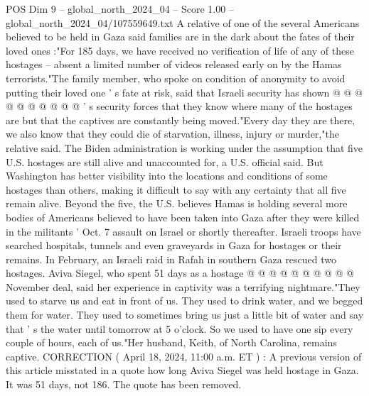 \begin{textsample}{POS Dim 9 – global\_north\_2024\_04 – Score 1.00 – global\_north\_2024\_04/107559649.txt}
A relative of one of the several Americans believed to be held in Gaza said families are in the dark about the fates of their loved ones :"For 185 days, we have received no verification of life of any of these hostages -- absent a limited number of videos released early on by the Hamas terrorists."The family member, who spoke on condition of anonymity to avoid putting their loved one ' s fate at risk, said that Israeli security has shown @ @ @ @ @ @ @ @ @ @ ' s security forces that they know where many of the hostages are but that the captives are constantly being moved."Every day they are there, we also know that they could die of starvation, illness, injury or murder,"the relative said.
The Biden administration is working under the assumption that five U.S. hostages are still alive and unaccounted for, a U.S. official said.
But Washington has better visibility into the locations and conditions of some hostages than others, making it difficult to say with any certainty that all five remain alive.
Beyond the five, the U.S. believes Hamas is holding several more bodies of Americans believed to have been taken into Gaza after they were killed in the militants ' Oct. 7 assault on Israel or shortly thereafter.
Israeli troops have searched hospitals, tunnels and even graveyards in Gaza for hostages or their remains.
In February, an Israeli raid in Rafah in southern Gaza rescued two hostages.
Aviva Siegel, who spent 51 days as a hostage @ @ @ @ @ @ @ @ @ @ November deal, said her experience in captivity was a terrifying nightmare."They used to starve us and eat in front of us.
They used to drink water, and we begged them for water.
They used to sometimes bring us just a little bit of water and say that ' s the water until tomorrow at 5 o'clock.
So we used to have one sip every couple of hours, each of us."Her husband, Keith, of North Carolina, remains captive.
CORRECTION ( April 18, 2024, 11:00 a.m.
ET ) : A previous version of this article misstated in a quote how long Aviva Siegel was held hostage in Gaza.
It was 51 days, not 186.
The quote has been removed.

\end{textsample}
